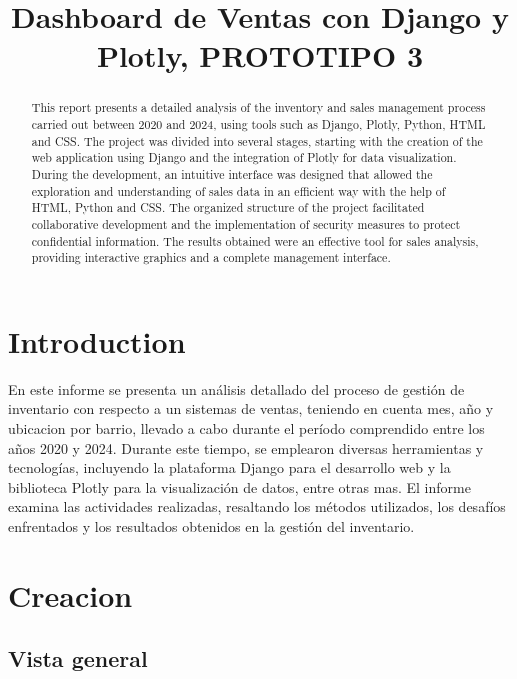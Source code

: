 \documentclass[conference]{IEEEtran}
\title{Dashboard de Ventas con Django y Plotly, PROTOTIPO 3}
\author{
\IEEEauthorblockN{Ángel Thomas Rodríguez Pinto - 506221014\\ angelt.rodriguezp@konradlorenz.edu.co}
\and
\IEEEauthorblockN{Eddy Andrés Díaz Santos - 506221024\\ eddya.diazs@konradlorenz.edu.co}
}
\begin{document}
\maketitle

\begin{abstract}

This report presents a detailed analysis of the inventory and sales management process carried out between 2020 and 2024, using tools such as Django, Plotly, Python, HTML and CSS. The project was divided into several stages, starting with the creation of the web application using Django and the integration of Plotly for data visualization. During the development, an intuitive interface was designed that allowed the exploration and understanding of sales data in an efficient way with the help of HTML, Python and CSS. The organized structure of the project facilitated collaborative development and the implementation of security measures to protect confidential information. The results obtained were an effective tool for sales analysis, providing interactive graphics and a complete management interface.


\end{abstract}

\section{Introduction}

En este informe se presenta un análisis detallado del proceso de gestión de inventario con respecto a un sistemas de ventas, teniendo en cuenta mes, año y ubicacion por barrio, llevado a cabo durante el período comprendido entre los años 2020 y 2024. Durante este tiempo, se emplearon diversas herramientas y tecnologías, incluyendo la plataforma Django para el desarrollo web y la biblioteca Plotly para la visualización de datos, entre otras mas. El informe examina las actividades realizadas, resaltando los métodos utilizados, los desafíos enfrentados y los resultados obtenidos en la gestión del inventario.



\section{Creacion}

\subsection{Vista general}
\end{document}
